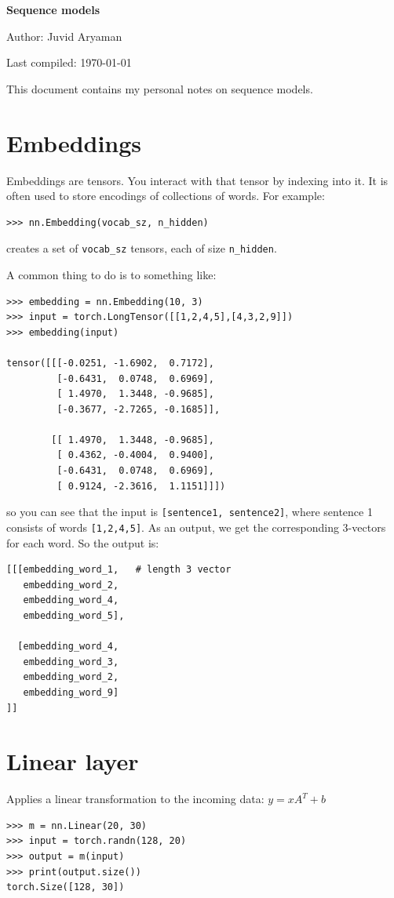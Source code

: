 \documentclass[11pt]{article}
\numberwithin{equation}{section}
\begin{document}
\begin{flushleft}
\textbf{\Large Sequence models}
\end{flushleft}

\begin{flushleft}
Author: Juvid Aryaman

Last compiled: \today
\end{flushleft}

\noindent This document contains my personal notes on sequence models.


\section{Embeddings}
Embeddings are tensors. You interact with that tensor by indexing into it. It is often used to store encodings of collections of words. For example:
\begin{lstlisting}
>>> nn.Embedding(vocab_sz, n_hidden)
\end{lstlisting}	
creates a set of \verb#vocab_sz# tensors, each of size \verb#n_hidden#. 

A common thing to do is to something like:
\begin{lstlisting}
>>> embedding = nn.Embedding(10, 3)
>>> input = torch.LongTensor([[1,2,4,5],[4,3,2,9]])
>>> embedding(input)

tensor([[[-0.0251, -1.6902,  0.7172],
         [-0.6431,  0.0748,  0.6969],
         [ 1.4970,  1.3448, -0.9685],
         [-0.3677, -2.7265, -0.1685]],

        [[ 1.4970,  1.3448, -0.9685],
         [ 0.4362, -0.4004,  0.9400],
         [-0.6431,  0.0748,  0.6969],
         [ 0.9124, -2.3616,  1.1151]]])
\end{lstlisting}
so you can see that the input is \verb#[sentence1, sentence2]#, where sentence 1 consists of words \verb#[1,2,4,5]#. As an output, we get the corresponding 3-vectors for each word. So the output is: 
\begin{lstlisting}
[[[embedding_word_1,   # length 3 vector
   embedding_word_2, 
   embedding_word_4, 
   embedding_word_5],
  
  [embedding_word_4, 
   embedding_word_3, 
   embedding_word_2, 
   embedding_word_9]
]]
\end{lstlisting}

\section{Linear layer}
Applies a linear transformation to the incoming data: $y = xA^T + b$
\begin{lstlisting}
>>> m = nn.Linear(20, 30)
>>> input = torch.randn(128, 20)
>>> output = m(input)
>>> print(output.size())
torch.Size([128, 30])
\end{lstlisting}
\end{document}
